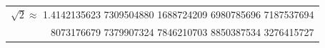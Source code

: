 \begin{table}
\begin{center}
\begin{tabular}{r}
$\sqrt 2 \approx $ \ttfamily\footnotesize 
1.4142135623 7309504880 1688724209 6980785696 7187537694 \\
\ttfamily\footnotesize
8073176679 7379907324 7846210703 8850387534 3276415727 \\

\end{tabular}
\end{center}
\end{table}
